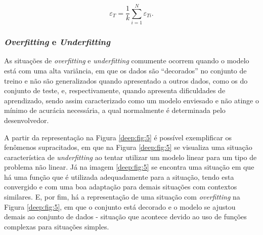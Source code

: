 \begin{equation}
    \label{deep:eq:16}
    \varepsilon_T = \frac{1}{k} \sum_{i=1}^{N} \varepsilon_{Ti}.
\end{equation}

\subsubsection{\textit{Overfitting} e \textit{Underfitting}}
\label{deep:overunder}

As situações de \textit{overfitting} e \textit{underfitting} comumente ocorrem quando o modelo está com uma alta variância, em que os dados são ``decorados'' no conjunto de treino e não são generalizados quando apresentado a outros dados, como os do conjunto de teste, e, respectivamente, quando apresenta dificuldades de aprendizado, sendo assim caracterizado como um modelo enviesado e não atinge o mínimo de acurácia necessária, a qual normalmente é determinada pelo desenvolvedor.

A partir da representação na Figura \ref{deep:fig:5} é possível exemplificar os fenômenos supracitados, em que na Figura \ref{deep:fig:5} se visualiza uma situação característica de \textit{underfitting} ao tentar utilizar um modelo linear para um tipo de problema não linear. Já na imagem \ref{deep:fig:5} se encontra uma situação em que há uma função que é utilizada adequadamente para a situação, tendo esta convergido e com uma boa adaptação para demais situações com contextos similares. E, por fim, há a representação de uma situação com \textit{overfitting} na Figura \ref{deep:fig:5}, em que o conjunto está decorado e o modelo se ajustou demais ao conjunto de dados - situação que acontece devido ao uso de funções complexas para situações simples.

